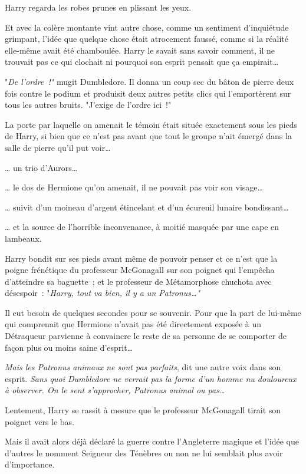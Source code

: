 Harry regarda les robes prunes en plissant les yeux.

Et avec la colère montante vint autre chose, comme un sentiment d'inquiétude grimpant, l'idée que quelque chose était atrocement faussé, comme si la réalité elle-même avait été chamboulée. Harry le savait sans savoir comment, il ne trouvait pas ce qui clochait ni pourquoi son esprit pensait que ça empirait…

"\emph{De l'ordre~!"} mugit Dumbledore. Il donna un coup sec du bâton de pierre deux fois contre le podium et produisit deux autres petits clics qui l'emportèrent sur tous les autres bruits. "J'exige de l'ordre ici~!"

La porte par laquelle on amenait le témoin était située exactement sous les pieds de Harry, si bien que ce n'est pas avant que tout le groupe n'ait émergé dans la salle de pierre qu'il put voir…

… un trio d'Aurors…

… le dos de Hermione qu'on amenait, il ne pouvait pas voir son visage…

… suivit d'un moineau d'argent étincelant et d'un écureuil lunaire bondissant…

… et la source de l'horrible inconvenance, à moitié masquée par une cape en lambeaux.

Harry bondit sur ses pieds avant même de pouvoir penser et ce n'est que la poigne frénétique du professeur McGonagall sur son poignet qui l'empêcha d'atteindre sa baguette~; et le professeur de Métamorphose chuchota avec désespoir~: "\emph{Harry, tout va bien, il y a un Patronus…"}

Il eut besoin de quelques secondes pour se souvenir. Pour que la part de lui-même qui comprenait que Hermione n'avait pas été directement exposée à un Détraqueur parvienne à convaincre le reste de sa personne de se comporter de façon plus ou moins saine d'esprit…

\emph{Mais les Patronus animaux ne sont pas parfaits}, dit une autre voix dans son esprit. \emph{Sans quoi Dumbledore ne verrait pas la forme d'un homme nu douloureux à observer. On le sent s'approcher, Patronus animal ou pas…}

Lentement, Harry se rassit à mesure que le professeur McGonagall tirait son poignet vers le bas.

Mais il avait alors déjà déclaré la guerre contre l'Angleterre magique et l'idée que d'autres le nomment Seigneur des Ténèbres ou non ne lui semblait plus avoir d'importance.

